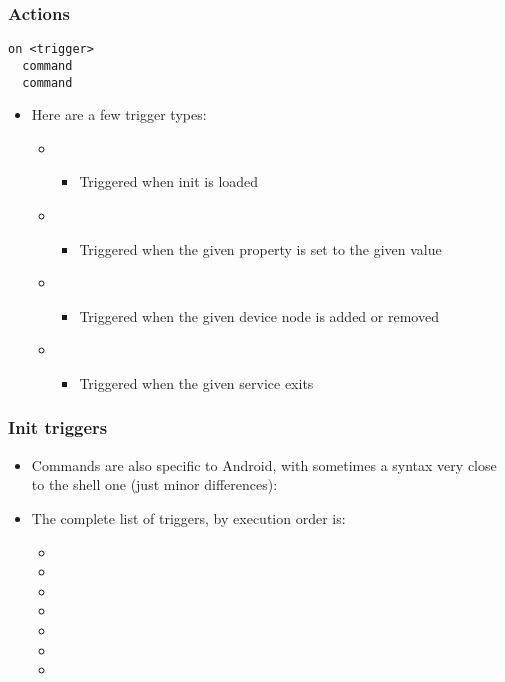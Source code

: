 \begin{frame}[fragile]
  \frametitle{Actions}
\begin{verbatim}
on <trigger>
  command
  command
\end{verbatim}
  \begin{itemize}
  \item Here are a few trigger types:
    \begin{itemize}
    \item {}
      \begin{itemize}
      \item Triggered when init is loaded
      \end{itemize}
    \item {}
      \begin{itemize}
      \item Triggered when the given property is set to the given
        value
      \end{itemize}
    \item {}
      \begin{itemize}
      \item Triggered when the given device node is added or removed
      \end{itemize}
    \item {}
      \begin{itemize}
      \item Triggered when the given service exits
      \end{itemize}
    \end{itemize}
  \end{itemize}
\end{frame}

\begin{frame}
  \frametitle{Init triggers}
  \begin{itemize}
  \item Commands are also specific to Android, with sometimes a syntax very
    close to the shell one (just minor differences):
  \item The complete list of triggers, by execution order is:
    \begin{itemize}
    \item {}
    \item {}
    \item {}
    \item {}
    \item {}
    \item {}
    \item {}
    \end{itemize}
  \end{itemize}
\end{frame}

